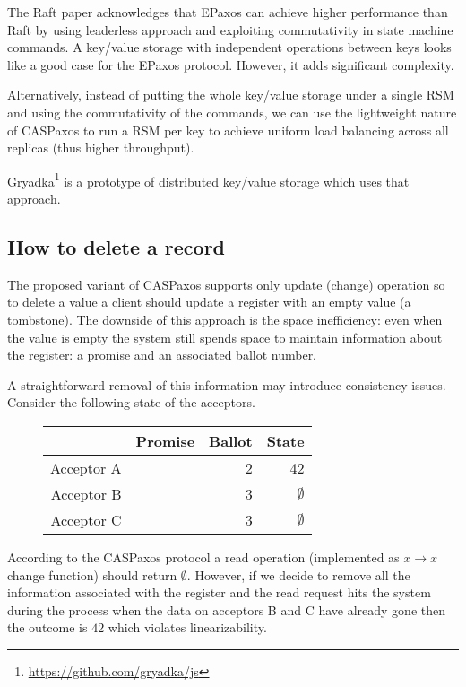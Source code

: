 \documentclass[12pt]{article}
\theoremstyle{definition}
\begin{document}
The Raft paper acknowledges\cite{raft} that EPaxos\cite{epaxos} can achieve higher performance than Raft by using leaderless approach and exploiting commutativity in state machine commands. A key/value storage with independent operations between keys looks like a good case for the EPaxos protocol. However, it adds significant complexity.

Alternatively, instead of putting the whole key/value storage under a single RSM and using the commutativity of the commands, we can use the lightweight nature of CASPaxos to run a RSM per key to achieve uniform load balancing across all replicas (thus higher throughput).

Gryadka\footnote{\href{https://github.com/gryadka/js}{https://github.com/gryadka/js}} is a prototype of distributed key/value storage which uses that approach.

\subsection{How to delete a record}

The proposed variant of CASPaxos supports only update (change) operation so to delete a value a client should update a register with an empty value (a tombstone). The downside of this approach is the space inefficiency: even when the value is empty the system still spends space to maintain information about the register: a promise and an associated ballot number.

A straightforward removal of this information may introduce consistency issues. Consider the following state of the acceptors.

\begin{figure}[!h]
  \centering
  \begin{tabular}{ r|r|r|r }
    & Promise & Ballot & State \\ \hline
    Acceptor A && 2 & 42 \\
    Acceptor B && 3 & $\emptyset$ \\
    Acceptor C && 3 & $\emptyset$ \\
  \end{tabular}
\end{figure}

According to the CASPaxos protocol a read operation (implemented as $x \to x$ change function) should return $\emptyset$. However, if we decide to remove all the information associated with the register and the read request hits the system during the process when the data on acceptors B and C have already gone then the outcome is $42$ which violates linearizability.
\end{document}

